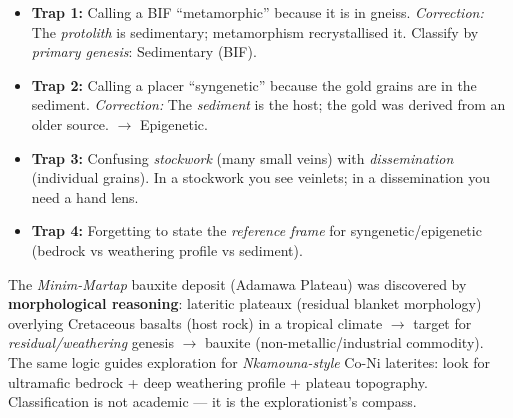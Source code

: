 \documentclass[11pt]{article}
\newcounter{popsec}
\newcounter{popsub}
\newcommand{\courssub}[1]{%
  \stepcounter{popsub}%
  \par\vspace{9pt}\noindent{\popxbold\fontsize{11.5}{13}\selectfont\color{popink}{\color{poporange}\thepopsec.\thepopsub}\hspace{6pt}#1}\par\nopagebreak\vspace{4pt}
}
\begin{document}
\begin{attention}
\begin{itemize}
  \item \textbf{Trap 1:} Calling a BIF ``metamorphic'' because it is in gneiss. \emph{Correction:} The \emph{protolith} is sedimentary; metamorphism recrystallised it. Classify by \emph{primary genesis}: Sedimentary (BIF).
  \item \textbf{Trap 2:} Calling a placer ``syngenetic'' because the gold grains are in the sediment. \emph{Correction:} The \emph{sediment} is the host; the gold was derived from an older source. $\rightarrow$ Epigenetic.
  \item \textbf{Trap 3:} Confusing \emph{stockwork} (many small veins) with \emph{dissemination} (individual grains). In a stockwork you see veinlets; in a dissemination you need a hand lens.
  \item \textbf{Trap 4:} Forgetting to state the \emph{reference frame} for syngenetic/epigenetic (bedrock vs weathering profile vs sediment).
\end{itemize}
\end{attention}

\begin{savaistu}
The \emph{Minim-Martap} bauxite deposit (Adamawa Plateau) was discovered by \textbf{morphological reasoning}: lateritic plateaux (residual blanket morphology) overlying Cretaceous basalts (host rock) in a tropical climate $\rightarrow$ target for \emph{residual/weathering} genesis $\rightarrow$ bauxite (non-metallic/industrial commodity). The same logic guides exploration for \emph{Nkamouna-style} Co-Ni laterites: look for ultramafic bedrock + deep weathering profile + plateau topography. Classification is not academic — it is the explorationist's compass.
\end{savaistu}

\courssub{Key Takeaways}
\end{document}
